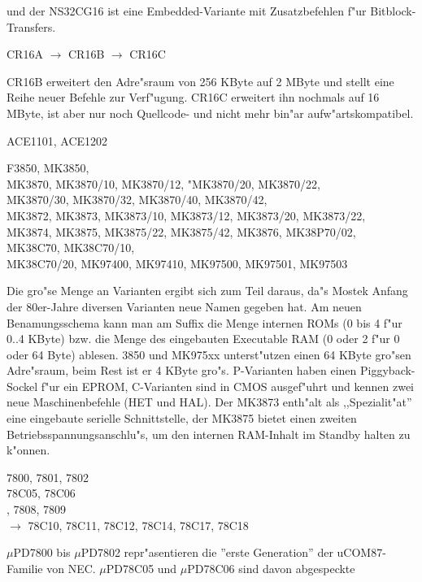 \documentclass[12pt,a4paper,twoside]{report}
\begin{document}
und der NS32CG16 ist eine Embedded-Variante mit Zusatzbefehlen f"ur
Bitblock-Transfers.
\begin{cpulist}
   CR16A $\rightarrow$ CR16B $\rightarrow$ CR16C
\end{cpulist}
CR16B erweitert den Adre"sraum von 256 KByte auf 2 MByte und stellt
eine Reihe neuer Befehle zur Verf"ugung.  CR16C erweitert ihn nochmals
auf 16 MByte, ist aber nur noch Quellcode- und nicht mehr bin"ar
aufw"artskompatibel. 
\begin{cpulist}
   ACE1101, ACE1202
\end{cpulist}
\begin{cpulist}
   F3850, MK3850, \\
\> MK3870, MK3870/10, MK3870/12, "MK3870/20, MK3870/22, \\
\> MK3870/30, MK3870/32, MK3870/40, MK3870/42, \\
\> MK3872, MK3873, MK3873/10, MK3873/12, MK3873/20, MK3873/22, \\
\> MK3874, MK3875, MK3875/22, MK3875/42, MK3876, MK38P70/02, \\
\> MK38C70, MK38C70/10, \\
\> MK38C70/20, MK97400, MK97410, MK97500, MK97501, MK97503
\end{cpulist}
Die gro"se Menge an Varianten ergibt sich zum Teil daraus, da"s
Mostek Anfang der 80er-Jahre diversen Varianten neue Namen gegeben
hat. Am neuen Benamungsschema kann man am Suffix die Menge internen
ROMs (0 bis 4 f"ur 0..4 KByte) bzw. die Menge des eingebauten 
Executable RAM (0 oder 2 f"ur 0 oder 64 Byte) ablesen.  3850 und
MK975xx unterst"utzen einen 64 KByte gro"sen Adre"sraum, beim Rest ist
er 4 KByte gro"s. P-Varianten haben einen Piggyback-Sockel f"ur ein
EPROM, C-Varianten sind in CMOS ausgef"uhrt und kennen zwei
neue Maschinenbefehle (HET und HAL).  Der MK3873 enth"alt als
,,Spezialit"at'' eine eingebaute serielle Schnittstelle, der
MK3875 bietet einen zweiten Betriebsspannungsanschlu"s, um den
internen RAM-Inhalt im Standby halten zu k"onnen.
\begin{cpulist}
   7800, 7801, 7802 \\
\> 78C05, 78C06 \\
, 7808, 7809 \\
 $\rightarrow$ 78C10, 78C11, 78C12, 78C14, 78C17, 78C18
\end{cpulist}
$\mu$PD7800 bis $\mu$PD7802 repr"asentieren die ''erste Generation'' der
uCOM87-Familie von NEC.  $\mu$PD78C05 und $\mu$PD78C06 sind davon abgespeckte
\end{document}
